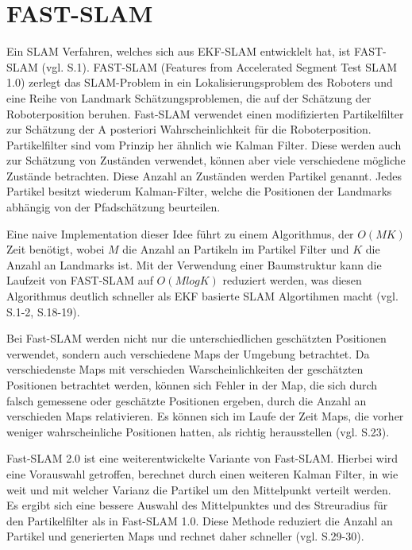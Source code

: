 \section{FAST-SLAM}
Ein SLAM Verfahren, welches sich aus EKF-SLAM entwicklelt hat, ist FAST-SLAM (vgl. \cite{orb_slam} S.1). FAST-SLAM (Features from Accelerated Segment Test SLAM 1.0) zerlegt das SLAM-Problem in ein Lokalisierungsproblem des Roboters und eine Reihe von Landmark Schätzungsproblemen, die auf der Schätzung der Roboterposition beruhen. Fast-SLAM verwendet einen modifizierten Partikelfilter zur Schätzung der \glqq A posteriori\grqq{} Wahrscheinlichkeit für die Roboterposition. Partikelfilter sind vom Prinzip her ähnlich wie Kalman Filter. Diese werden auch zur Schätzung von Zuständen verwendet, können aber viele verschiedene mögliche Zustände betrachten. Diese Anzahl an Zuständen werden Partikel genannt. Jedes Partikel besitzt wiederum Kalman-Filter, welche die Positionen der Landmarks abhängig von der Pfadschätzung beurteilen.

Eine naive Implementation dieser Idee führt zu einem Algorithmus, der \(O(MK)\) Zeit benötigt, wobei \(M\) die Anzahl an Partikeln im Partikel Filter und \( K\) die Anzahl an Landmarks ist. Mit der Verwendung einer Baumstruktur kann die Laufzeit von FAST-SLAM auf \(O(MlogK)\) reduziert werden, was diesen Algorithmus deutlich schneller als EKF basierte SLAM Algortihmen macht (vgl. \cite{ekf_problems} S.1-2, \cite{slam_studi} S.18-19).

Bei Fast-SLAM werden nicht nur die unterschiedlichen geschätzten Positionen verwendet, sondern auch verschiedene Maps der Umgebung betrachtet. Da verschiedenste Maps mit verschieden Warscheinlichkeiten der geschätzten Positionen betrachtet werden, können sich Fehler in der Map, die sich durch falsch gemessene oder geschätzte Positionen ergeben, durch die Anzahl an verschieden Maps relativieren. Es können sich im Laufe der Zeit Maps, die vorher weniger wahrscheinliche Positionen hatten, als richtig herausstellen (vgl.  \cite{slam_studi} S.23).

Fast-SLAM 2.0 ist eine weiterentwickelte Variante von Fast-SLAM. Hierbei wird eine Vorauswahl getroffen, berechnet durch einen weiteren Kalman Filter, in wie weit und mit welcher Varianz die Partikel um den Mittelpunkt verteilt werden. Es ergibt sich eine bessere Auswahl des Mittelpunktes und des Streuradius für den Partikelfilter als in Fast-SLAM 1.0. Diese Methode reduziert die Anzahl an Partikel und generierten Maps und rechnet daher schneller (vgl. \cite{slam_studi} S.29-30).

